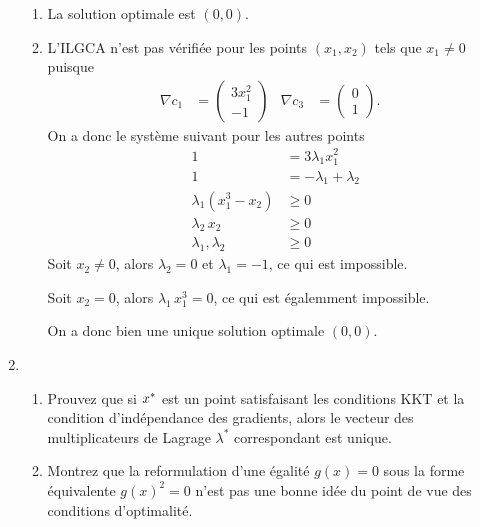 \begin{enumerate}
  \begin{solution}
    \begin{enumerate}
      \item La solution optimale est $(0,0)$.
      \item L'ILGCA n'est pas vérifiée pour les points $(x_1,x_2)$ 
      tels que $x_1 \neq 0$ puisque
      \begin{align*}
        \nabla c_1 &= \begin{pmatrix} 3x_1^2 \\ -1 \end{pmatrix} &
        \nabla c_3 &= \begin{pmatrix} 0 \\ 1 \end{pmatrix}. &
      \end{align*}
      On a donc le système suivant pour les autres points 
      \begin{align*}
        1 &= 3 \lambda_1 x_1^2 \\
        1 &= -\lambda_1 + \lambda_2 \\
        \lambda_1 (x_1^3-x_2) &\geq 0 \\
        \lambda_2 \, x_2 &\geq 0 \\
        \lambda_1 , \lambda_2 &\geq 0
      \end{align*}
      Soit $x_2 \neq 0$, alors $\lambda_2 = 0$ et $\lambda_1 = -1$,
      ce qui est impossible.
      
      Soit $x_2 = 0$, alors $\lambda_1 \, x_1^3 = 0$,
      ce qui est égalemment impossible.
      
      On a donc bien une unique solution optimale $(0,0)$.
    \end{enumerate}
  \end{solution}
  
  \item 
  \begin{enumerate}
    \item Prouvez que si $x^*$ est un point satisfaisant les conditions KKT
    et la condition d'indépendance des gradients, alors le vecteur des 
    multiplicateurs de Lagrage $\lambda^*$ correspondant est unique.
    \item Montrez que la reformulation d'une égalité $g(x)=0$ sous la forme
    équivalente $g(x)^2=0$ n'est pas une bonne idée du point de vue des 
    conditions d'optimalité.
  \end{enumerate}
  

\end{enumerate}
